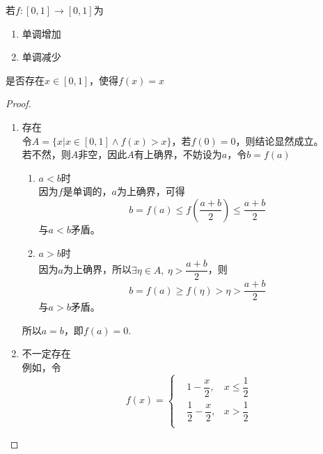 \begin{proposition}

    若$f:[0,1] \to [0,1]$为

    \begin{enumerate}

            \item 单调增加
            
            \item 单调减少

    \end{enumerate}

    是否存在$x \in [0,1]$，使得$f(x) = x$

\end{proposition}

\begin{proof}

    \begin{enumerate}

        \item 
            存在\\
            令$A = \{x | x \in [0,1] \land f(x) > x \} $，若$f(0) = 0$，则结论显然成立。\\
            若不然，则$A$非空，因此$A$有上确界，不妨设为$a$，令$b = f(a)$

            \begin{enumerate}

                \item $a<b$时\\
                    因为$f$是单调的，$a$为上确界，可得
                    $$b = f(a) \leq f\left(\dfrac{a+b}{2}\right) \leq \dfrac{a+b}{2}$$
                    与$a<b$矛盾。

                \item 
                    $a>b$时\\
                    因为$a$为上确界，所以$\exists \eta \in A, \ \eta > \dfrac{a+b}{2}$，则
                    $$b = f(a) \geq f(\eta) > \eta > \dfrac{a+b}{2}$$
                    与$a>b$矛盾。

            \end{enumerate}

            所以$a=b$，即$f(a) = 0$.
        
        \item 
            不一定存在\\
            例如，令
            $$f(x) = \left\{
                \begin{aligned}
                    & 1 - \dfrac{x}{2}, &x \leq \dfrac{1}{2} \\
                    & \dfrac{1}{2} - \dfrac{x}{2} , &x > \dfrac{1}{2} \\
                \end{aligned}
                \right.
            $$
            
    \end{enumerate}

\end{proof}

